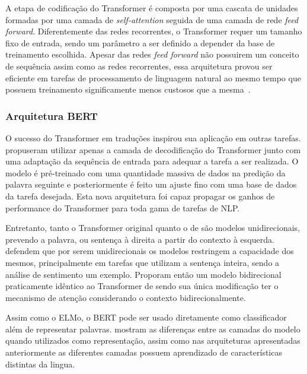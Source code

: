 
A etapa de codificação do Transformer é composta por uma cascata de unidades
formadas por uma camada de \textit{self-attention} seguida de uma camada de
rede \textit{feed forward}.
Diferentemente das redes recorrentes, o Transformer requer um tamanho fixo de
entrada, sendo um parâmetro a ser definido a depender da base de treinamento
escolhida.
Apesar das redes \textit{feed forward} não possuirem um conceito de sequência
assim como as redes recorrentes, essa arquitetura provou ser eficiente em
tarefas de processamento de linguagem natural ao mesmo tempo que possuem
treinamento significamente menos custosos que a mesma~\cite{vaswani17}.

\subsubsection{Arquitetura BERT}

O sucesso do Transformer em traduções inspirou sua aplicação em outras tarefas.
\citet{radford18} propuseram utilizar apenas a camada de decodificação do
Transformer junto com uma adaptação da sequência de entrada para adequar a
tarefa a ser realizada.
O modelo é pré-treinado com uma quantidade massiva de dados na predição da
palavra seguinte e posteriormente é feito um ajuste fino com uma base de dados
da tarefa desejada.
Esta nova arquitetura foi capaz propagar os ganhos de performance do Transformer
para toda gama de tarefas de NLP.

Entretanto, tanto o Transformer original quanto o de \citet{radford18} são
modelos unidirecionais, prevendo a palavra, ou sentença à direita a partir do
contexto à esquerda.
\citet{devlin18} defendem que por serem unidirecionais os modelos restringem a
capacidade dos mesmos, principalmente em tarefas que utilizam a sentença
inteira, sendo a análise de sentimento um exemplo.
Proporam então um modelo bidirecional praticamente idêntico ao Transformer de
\citet{radford18} sendo sua única modificação ter o mecanismo de atenção
considerando o contexto bidirecionalmente.

Assim como o ELMo, o BERT pode ser usado diretamente como classificador além de
representar palavras.
\citet{devlin18} mostram as diferenças entre as camadas do modelo quando
utilizados como representação, assim como nas arquiteturas apresentadas
anteriormente as diferentes camadas possuem aprendizado de características
distintas da lingua.

